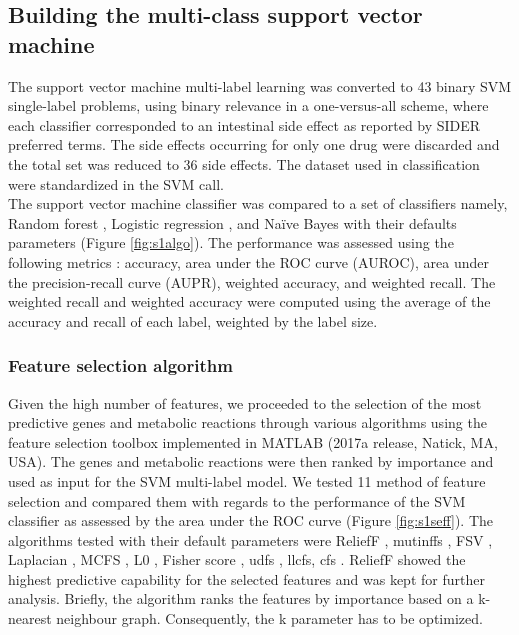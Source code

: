 \subsection{Building the multi-class support vector machine}
The support vector machine multi-label learning was converted to 43 binary SVM single-label problems, using binary relevance in a one-versus-all scheme, where each classifier corresponded to an intestinal side effect as reported by SIDER preferred terms. The side effects occurring for only one drug were discarded and the total set was reduced to 36 side effects. The dataset used in classification were standardized in the SVM call.\\
The support vector machine classifier \cite{cristianini2000introduction} was compared to a set of classifiers namely, Random forest \cite{breiman2001random}, Logistic regression \cite{mccullagh1984generalized}, and Na\"{i}ve Bayes \cite{friedman2001elements} with their defaults parameters (Figure \ref{fig:s1algo}). The performance was assessed using the following metrics \cite{baldi2000assessing}: accuracy, area under the ROC curve (AUROC), area under the precision-recall curve (AUPR), weighted accuracy, and weighted recall. The weighted recall and weighted accuracy were computed using the average of the accuracy and recall of each label, weighted by the label size.
\subsubsection{Feature selection algorithm}
Given the high number of features, we proceeded to the selection of the most predictive genes and metabolic reactions through various algorithms using the feature selection toolbox \cite{RoffoICCV17} implemented in MATLAB (2017a release, Natick, MA, USA). The genes and metabolic reactions were then ranked by importance and used as input for the SVM multi-label model.
We tested 11 method of feature selection and compared them with regards to the performance of the SVM classifier as assessed by the area under the ROC curve (Figure \ref{fig:s1seff}).  The algorithms tested with their default parameters were ReliefF \cite{kira1992feature}, mutinffs \cite{luo2011methods}, FSV \cite{bradley1998feature}, Laplacian \cite{he2006laplacian}, MCFS \cite{cai2010unsupervised}, L0 \cite{han20150}, Fisher score \cite{gu2012generalized}, udfs \cite{yang2011l2}, llcfs, cfs \cite{hall1999correlation}.
ReliefF showed the highest predictive capability for the selected features and was kept for further analysis. Briefly, the algorithm ranks the features by importance based on a k-nearest neighbour graph. Consequently, the k parameter has to be optimized.
